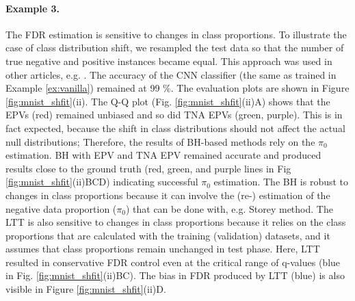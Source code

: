 \documentclass{article}
\begin{document}
\paragraph{Example 3.} The FDR estimation is sensitive to changes in class proportions. To illustrate the case of class distribution shift, we resampled the test data so that the number of true negative and positive instances became equal. This approach was used in other articles, e.g.  \cite{joseph_d__viviano__2019}. The accuracy of the CNN classifier (the same as trained in Example \ref{ex:vanilla}) remained at 99 \%. The evaluation plots are shown in Figure \ref{fig:mnist_shfit}(ii). The Q-Q plot (Fig. \ref{fig:mnist_shfit}(ii)A) shows that the EPVs (red) remained unbiased and so did TNA EPVs (green, purple). This is in  fact expected, because the shift in class distributions should not affect the actual null distributions; Therefore, the results of BH-based methods rely on the $\pi_0$ estimation. BH with EPV and TNA EPV remained accurate and produced results close to the ground truth (red, green, and purple lines in Fig \ref{fig:mnist_shfit}(ii)BCD) indicating successful $\pi_0$ estimation. The BH is robust to changes in class proportions because it can involve the (re-) estimation of the negative data proportion ($\pi_0$) that can be done with, e.g. Storey method. The LTT is also sensitive to changes in class proportions because it relies on the class proportions that are calculated with the training (validation) datasets, and it assumes that class proportions remain unchanged in test phase. Here, LTT resulted in conservative FDR control even at the critical range of q-values (blue in Fig. \ref{fig:mnist_shfit}(ii)BC). The bias in FDR produced by LTT (blue) is also visible in Figure \ref{fig:mnist_shfit}(ii)D. 



%
%
%
%
%
\end{document}
